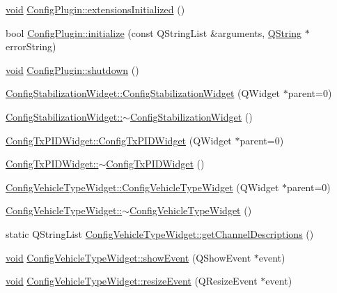 \begin{DoxyCompactItemize}
\hyperlink{group___u_a_v_objects_plugin_ga444cf2ff3f0ecbe028adce838d373f5c}{void} \hyperlink{group___config_plugin_gabbca0b710aa7b4870df57f979e248833}{Config\-Plugin\-::extensions\-Initialized} ()
\item 
bool \hyperlink{group___config_plugin_ga6caac2a6d708537fbabed44ad35e694f}{Config\-Plugin\-::initialize} (const Q\-String\-List \&arguments, \hyperlink{group___u_a_v_objects_plugin_gab9d252f49c333c94a72f97ce3105a32d}{Q\-String} $\ast$error\-String)
\item 
\hyperlink{group___u_a_v_objects_plugin_ga444cf2ff3f0ecbe028adce838d373f5c}{void} \hyperlink{group___config_plugin_gaf7af8833b63795f7bb96fd43bf74fb3e}{Config\-Plugin\-::shutdown} ()
\item 
\hyperlink{group___config_plugin_ga7ede076de26384e87d8b8357b391c0b6}{Config\-Stabilization\-Widget\-::\-Config\-Stabilization\-Widget} (Q\-Widget $\ast$parent=0)
\item 
\hyperlink{group___config_plugin_gaeca64ce80c3529dc40b452e3bcef2ffd}{Config\-Stabilization\-Widget\-::$\sim$\-Config\-Stabilization\-Widget} ()
\item 
\hyperlink{group___config_plugin_ga2ecc01b090b6955e7204c19432ad8628}{Config\-Tx\-P\-I\-D\-Widget\-::\-Config\-Tx\-P\-I\-D\-Widget} (Q\-Widget $\ast$parent=0)
\item 
\hyperlink{group___config_plugin_ga2c39980676875ea742391215e79d5262}{Config\-Tx\-P\-I\-D\-Widget\-::$\sim$\-Config\-Tx\-P\-I\-D\-Widget} ()
\item 
\hyperlink{group___config_plugin_ga073c5b646c2487874d095f97989f4358}{Config\-Vehicle\-Type\-Widget\-::\-Config\-Vehicle\-Type\-Widget} (Q\-Widget $\ast$parent=0)
\item 
\hyperlink{group___config_plugin_ga7edb0b23fc32af7728baa08038a79202}{Config\-Vehicle\-Type\-Widget\-::$\sim$\-Config\-Vehicle\-Type\-Widget} ()
\item 
static Q\-String\-List \hyperlink{group___config_plugin_ga65301666bc0f14e94e8f718af4e6cc08}{Config\-Vehicle\-Type\-Widget\-::get\-Channel\-Descriptions} ()
\item 
\hyperlink{group___u_a_v_objects_plugin_ga444cf2ff3f0ecbe028adce838d373f5c}{void} \hyperlink{group___config_plugin_gab830a9c8fbb8c286953a005382701f94}{Config\-Vehicle\-Type\-Widget\-::show\-Event} (Q\-Show\-Event $\ast$event)
\item 
\hyperlink{group___u_a_v_objects_plugin_ga444cf2ff3f0ecbe028adce838d373f5c}{void} \hyperlink{group___config_plugin_gaa35315a56ddec502ecc1c683b51364d8}{Config\-Vehicle\-Type\-Widget\-::resize\-Event} (Q\-Resize\-Event $\ast$event)

\end{DoxyCompactItemize}
